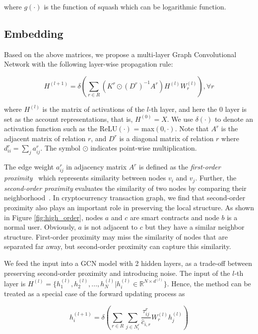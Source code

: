 \noindent where $g(\cdot)$ is the function of squash which can be logarithmic function.

\subsection{Embedding}
\label{sec:rGCN layers}
Based on the above matrices, we propose a multi-layer Graph Convolutional Network with the following layer-wise propagation rule:

\begin{equation}
H^{(l+1)}=\delta(\sum_{r\in R} (K^r\odot (D^r)^{-1}A^r)H^{(l)}W_r^{(l)}),\forall r
\end{equation}

\noindent where $H^{(l)}$ is the matrix of activations of the $l$-th layer, and here the $0$ layer is set as the account representations, that is, $H^{(0)}=X$. We use $\delta(\cdot)$ to denote an activation function such as the ReLU$(\cdot)$ = max$(0,\cdot)$. Note that $A^r$ is the adjacent matrix of relation $r$, and $D^r$ is a diagonal matrix of relation $r$ where $d^r_{ii}=\sum_{j}a^r_{ij}$. The symbol $\odot$ indicates point-wise multiplication.

The edge weight $a^r_{ij}$ in adjacency matrix $A^r$ is defined as the \emph{first-order proximity}~\cite{tang2015line} which represents similarity between nodes $v_i$ and $v_j$. Further, the \emph{second-order proximity} evaluates the similarity of two nodes by comparing their neighborhood~\cite{goyal2018graph}. In cryptocurrency transaction graph, we find that second-order proximity also plays an important role in preserving the local structure. As shown in Figure \ref{fig:high_order}, nodes $a$ and $c$ are smart contracts and node $b$ is a normal user. Obviously, $a$ is not adjacent to $c$  but they have a similar neighbor structure. First-order proximity may miss the similarity of nodes that are separated far away, but second-order proximity can capture this similarity.

We feed the input into a GCN model with 2 hidden layers, as a trade-off between preserving second-order proximity and introducing noise. The input of the $l$-th layer is $H^{(l)}=\{h_1^{(l)},h_2^{(l)},...,h_N^{(l)}|h_i^{(l)}\in \mathbb{R}^{N \times d^{(l)}}\}$. Hence, the method can be treated as a special case of the forward updating process as

\begin{equation}
h_i^{(l+1)}=\delta(\sum_{r\in R} \sum_{j \in N_i^r} \frac{\tau_{ij}^r}{\hat c_{i,r}}W_r^{(l)}h_j^{(l)})
\end{equation}

